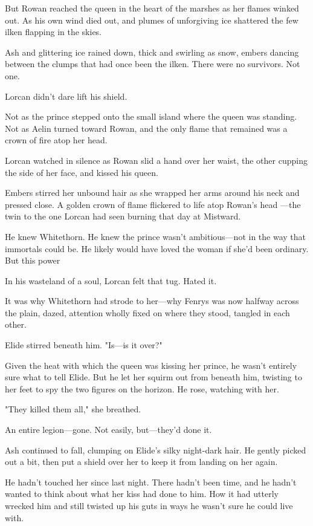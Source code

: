 But Rowan reached the queen in the heart of the marshes as her flames winked out.
As his own wind died out, and plumes of unforgiving ice shattered the few ilken flapping in the skies.

Ash and glittering ice rained down, thick and swirling as snow, embers dancing between the clumps that had once been the ilken.
There were no survivors.
Not one.

Lorcan didn't dare lift his shield.

Not as the prince stepped onto the small island where the queen was standing.
Not as Aelin turned toward Rowan, and the only flame that remained was a crown of fire atop her head.

Lorcan watched in silence as Rowan slid a hand over her waist, the other cupping the side of her face, and kissed his queen.

Embers stirred her unbound hair as she wrapped her arms around his neck and pressed close.
A golden crown of flame flickered to life atop Rowan's head ---the twin to the one Lorcan had seen burning that day at Mistward.

He knew Whitethorn.
He knew the prince wasn't ambitious---not in the way that immortals could be.
He likely would have loved the woman if she'd been ordinary.
But this power 

In his wasteland of a soul, Lorcan felt that tug.
Hated it.

It was why Whitethorn had strode to her---why Fenrys was now halfway across the plain, dazed, attention wholly fixed on where they stood, tangled in each other.

Elide stirred beneath him.
"Is---is it over?"

Given the heat with which the queen was kissing her prince, he wasn't entirely sure what to tell Elide.
But he let her squirm out from beneath him, twisting to her feet to spy the two figures on the horizon.
He rose, watching with her.

"They killed them all," she breathed.

An entire legion---gone.
Not easily, but---they'd done it.

Ash continued to fall, clumping on Elide's silky night-dark hair.
He gently picked out a bit, then put a shield over her to keep it from landing on her again.

He hadn't touched her since last night.
There hadn't been time, and he hadn't wanted to think about what her kiss had done to him.
How it had utterly wrecked him and still twisted up his guts in ways he wasn't sure he could live with.

